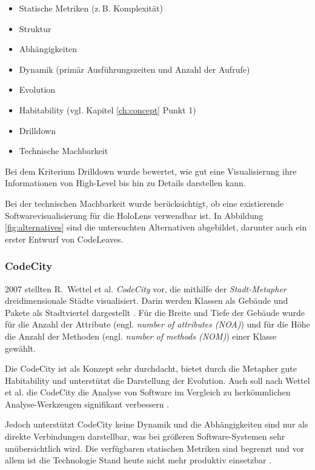 \begin{itemize}
  \item Statische Metriken (z.\,B. Komplexität)
  \item Struktur
  \item Abhängigkeiten
  \item Dynamik (primär Ausführungszeiten und Anzahl der Aufrufe)
  \item Evolution
  \item Habitability (vgl. Kapitel \ref{ch:concept} Punkt 1)
  \item Drilldown
  \item Technische Machbarkeit
\end{itemize}

Bei dem Kriterium Drilldown wurde bewertet, wie gut eine Visualisierung ihre Informationen von High-Level bis hin zu Details darstellen kann.

Bei der technischen Machbarkeit wurde berücksichtigt, ob eine existierende Softwarevisualisierung für die HoloLens verwendbar ist. In Abbildung \ref{fig:alternatives} sind die untersuchten Alternativen abgebildet, darunter auch ein erster Entwurf von CodeLeaves.

\subsubsection*{CodeCity}
2007 stellten R.\ Wettel et al. \textit{CodeCity} vor, die mithilfe der \textit{Stadt-Metapher} dreidimensionale Städte visualisiert. Darin werden Klassen als Gebäude und Pakete als Stadtviertel dargestellt \cite{wettel2007program, wettel2008visual, wettel2011software}. Für die Breite und Tiefe der Gebäude wurde für die Anzahl der Attribute (engl. \emph{number of attributes (NOA)}) und für die Höhe die Anzahl der Methoden (engl. \emph{number of methods (NOM)}) einer Klasse gewählt.

Die CodeCity ist als Konzept sehr durchdacht, bietet durch die Metapher gute Habitability und unterstützt die Darstellung der Evolution. Auch soll nach Wettel et al. die CodeCity die Analyse von Software im Vergleich zu herkömmlichen Analyse-Werkzeugen signifikant verbessern \cite{wettel2011software}.

Jedoch unterstützt CodeCity keine Dynamik und die Abhängigkeiten sind nur als direkte Verbindungen darstellbar, was bei größeren Software-Systemen sehr unübersichtlich wird. Die verfügbaren statischen Metriken sind begrenzt und vor allem ist die Technologie Stand heute nicht mehr produktiv einsetzbar \cite{puetz2017softwarevisualisierung}.

